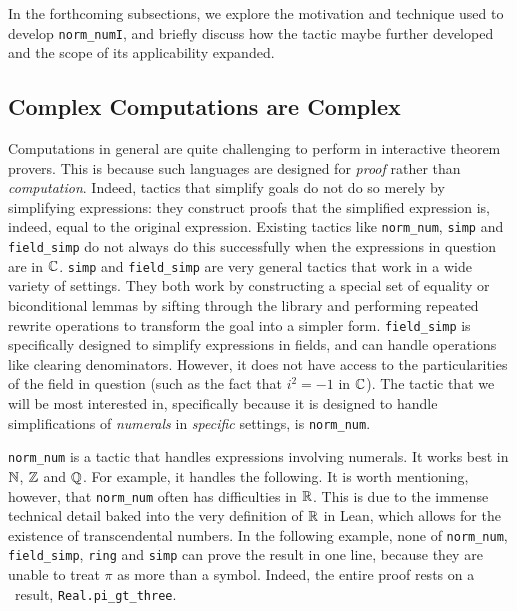 In the forthcoming subsections, we explore the motivation and technique used to develop \lstinline|norm_numI|, and briefly discuss how the tactic maybe further developed and the scope of its applicability expanded.

\subsection{Complex Computations are Complex}

Computations in general are quite challenging to perform in interactive theorem provers. This is because such languages are designed for \textit{proof} rather than \textit{computation}. Indeed, tactics that simplify goals do not do so merely by simplifying expressions: they construct proofs that the simplified expression is, indeed, equal to the original expression. Existing tactics like \lstinline|norm_num|, \lstinline|simp| and \lstinline|field_simp| do not always do this successfully when the expressions in question are in $\mathbb{C}$. \lstinline|simp| and \lstinline|field_simp| are very general tactics that work in a wide variety of settings. They both work by constructing a special set of equality or biconditional lemmas by sifting through the library and performing repeated rewrite operations to transform the goal into a simpler form. \lstinline|field_simp| is specifically designed to simplify expressions in fields, and can handle operations like clearing denominators. However, it does not have access to the particularities of the field in question (such as the fact that $i^2 = -1$ in $\mathbb{C}$). The tactic that we will be most interested in, specifically because it is designed to handle simplifications of \textit{numerals} in \textit{specific} settings, is \lstinline|norm_num|.

\lstinline|norm_num| is a tactic that handles expressions involving numerals. It works best in $\mathbb{N}$, $\mathbb{Z}$ and $\mathbb{Q}$. For example, it handles the following.
It is worth mentioning, however, that \lstinline|norm_num| often has difficulties in $\mathbb{R}$. This is due to the immense technical detail baked into the very definition of $\mathbb{R}$ in Lean, which allows for the existence of transcendental numbers. In the following example, none of \lstinline|norm_num|, \lstinline|field_simp|, \lstinline|ring| and \lstinline|simp| can prove the result in one line, because they are unable to treat $\pi$ as more than a symbol. Indeed, the entire proof rests on a \mathlib\ result, \lstinline|Real.pi_gt_three|.

